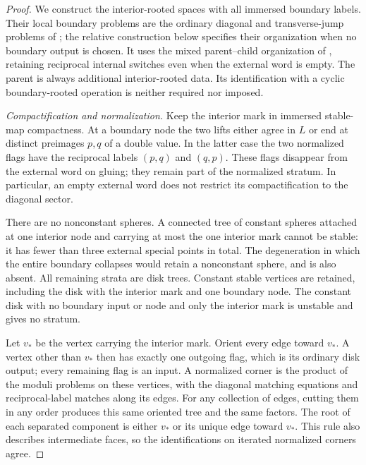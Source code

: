 \documentclass[11pt]{article}
\numberwithin{equation}{section}
\theoremstyle{definition}
\theoremstyle{remark}
\begin{document}
\begin{proof}
We construct the interior-rooted spaces with all immersed boundary
labels.  Their local boundary problems are the ordinary diagonal and
transverse-jump problems of \cite[Sections~4--5]{AkahoJoyce}; the
relative construction below specifies their organization when no
boundary output is chosen.  It uses the mixed parent--child
organization of \cite[Propositions~16.3 and~16.14]{AFOOO2026}, retaining
reciprocal internal switches even when the external word is empty.
The parent is always additional interior-rooted data.  Its
identification with a cyclic boundary-rooted operation is neither
required nor imposed.

\emph{Compactification and normalization.}
Keep the interior mark in immersed stable-map compactness.  At a
boundary node the two lifts either agree in $L$ or end at distinct
preimages $p,q$ of a double value.  In the latter case the two
normalized flags have the reciprocal labels $(p,q)$ and $(q,p)$.
These flags disappear from the external word on gluing; they remain
part of the normalized stratum.  In particular, an empty external
word does not restrict its compactification to the diagonal sector.

There are no nonconstant spheres.  A connected tree of constant
spheres attached at one interior node and carrying at most the one
interior mark cannot be stable: it has fewer than three external
special points in total.  The degeneration in which the entire
boundary collapses would retain a nonconstant sphere, and is also
absent.  All remaining strata are disk trees.  Constant stable
vertices are retained, including the disk with the interior mark
and one boundary node.  The constant disk with no boundary input or
node and only the interior mark is unstable and gives no stratum.

Let $v_*$ be the vertex carrying the interior mark.  Orient every
edge toward $v_*$.  A vertex other than $v_*$ then has exactly one
outgoing flag, which is its ordinary disk output; every remaining
flag is an input.  A normalized corner is the product of the moduli
problems on these vertices, with the diagonal matching equations
and reciprocal-label matches along its edges.  For any collection
of edges, cutting them in any order produces this same oriented
tree and the same factors.  The root of each separated component
is either $v_*$ or its unique edge toward $v_*$.  This rule also
describes intermediate faces, so the identifications on iterated
normalized corners agree.


\end{proof}
\end{document}

